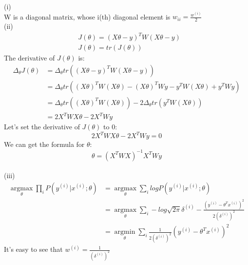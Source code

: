 \begin{answer}
(i)\\
W is a diagonal matrix, whose i(th) diagonal element is $w_{ii} = \frac{w^{(i)}}{2}$ \\
(ii)\\
\begin{align*}
    &J(\theta) = (X\theta - y)^T W (X\theta - y)\\
    &J(\theta) = tr(J(\theta))
\end{align*}
The derivative of $J(\theta)$ is:
\begin{align*}
    \Delta_\theta J(\theta) &= \Delta_\theta tr((X\theta - y)^T W (X\theta - y))\\
    &= \Delta_\theta tr( (X\theta)^T W (X\theta) - (X\theta)^T W y - y^T W (X\theta) + y^T W y)\\
    &= \Delta_\theta  tr( (X\theta)^T W (X\theta)) - 2\Delta_\theta tr(y^T W (X\theta))\\
    &= 2 X^T W X \theta - 2 X^T W y
\end{align*}
Let's set the derivative of $J(\theta)$ to $0$:
    $$2 X^T W X \theta - 2 X^T W y = 0$$
We can get the formula for $\theta$:
    $$\theta = (X^T W X)^{-1} X^T W y$$\\

(iii)
\begin{align*}
    \mathop{\arg\max}\limits_\theta \prod\limits_i P(y^{(i)}|x^{(i)};\theta) &= \mathop{\arg\max}\limits_\theta \sum\limits_i log P(y^{(i)}|x^{(i)};\theta)\\
    &= \mathop{\arg\max}\limits_\theta \sum\limits_i -log\sqrt{2\pi}\delta^{(i)} - \frac{(y^{(i)} - \theta^T x^{(i)}) ^ 2}{2(\delta^{(i)})^2}\\
    &= \mathop{\arg\min}\limits_\theta \sum\limits_i \frac{1}{2(\delta^{(i)})^2}(y^{(i)} - \theta^T x^{(i)})^2
\end{align*}
It's easy to see that $w^{(i)} = \frac{1}{(\delta^{(i)})^2}$
\end{answer}
